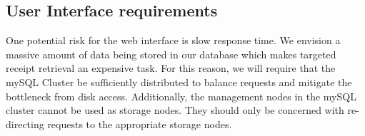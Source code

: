 \subsection{User Interface requirements}
\label{sec:requirements.interface}

One potential risk for the web interface is slow response time.  We envision a massive amount of data being stored in our database which makes targeted receipt retrieval an expensive task.  For this reason, we will require that the mySQL Cluster be sufficiently distributed to balance requests and mitigate the bottleneck from disk access.  Additionally, the management nodes in the mySQL cluster cannot be used as storage nodes.  They should only be concerned with re-directing requests to the appropriate storage nodes.
